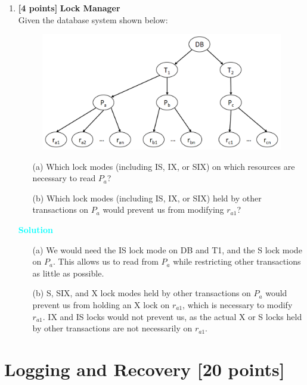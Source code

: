\documentclass[10pt]{article}
\newenvironment{solution}
    { \begin{mdframed}[backgroundcolor=gray!10] \textcolor{cyan}{\textbf{Solution}} \\}
    {  \end{mdframed}}
\begin{document}
\begin{enumerate}
	\item \textbf{[4 points]} \textbf{Lock Manager} \\
	      Given the database system shown below:
	      \begin{figure}[ht]
		      \centering
		      \includegraphics[width=0.7\linewidth]{lock_mode}
	      \end{figure}
	      \begin{itemize}
		      \item[(a)] Which lock modes (including IS, IX, or SIX) on which resources are necessary to read $P_a$?
		      \item[(b)] Which lock modes (including IS, IX, or SIX) held by other transactions on $P_a$ would prevent us from modifying $r_{a1}$?
	      \end{itemize}
	      \begin{solution}
		      \begin{itemize}
			      \item[(a)] We would need the IS lock mode on DB and T1, and the S lock mode on $P_a$. This allows us
			            to read from $P_a$ while restricting other transactions as little as possible.
			      \item[(b)] S, SIX, and X lock modes held by other transactions on $P_a$ would prevent us from holding
			            an X lock on $r_{a1}$, which is necessary to modify $r_{a1}$. IX and IS locks would not prevent us, as
			            the actual X or S locks held by other transactions are not necessarily on $r_{a1}$.
		      \end{itemize}
	      \end{solution}
\end{enumerate}



\newpage
\section{Logging and Recovery \textbf{[20 points]}}
\end{document}
